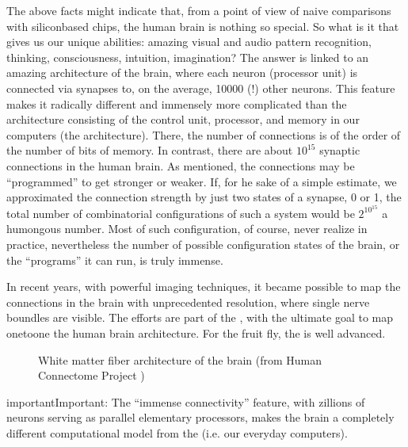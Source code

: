 \documentclass[letterpaper,10pt,english]{jupyterBook}
\let\sphinxpxdimen\pdfpxdimen\else\newdimen\sphinxpxdimen
\begin{document}
\sphinxAtStartPar
The above facts might indicate that, from a point of view of naive comparisons with silicon\sphinxhyphen{}based chips, the human brain is nothing so special. So what is it that gives us our unique abilities: amazing visual and audio pattern recognition, thinking, consciousness, intuition, imagination? The answer is linked to an amazing architecture of the brain, where each neuron (processor unit) is connected via synapses to, on the average, 10000 (!) other neurons. This feature makes it radically different and immensely more complicated than the architecture consisting of the control unit, processor, and memory in our computers (the  architecture). There, the number of connections is of the order of the number of bits of memory. In contrast, there are about \(10^{15}\) synaptic connections in the human brain. As mentioned, the connections may be “programmed” to get stronger or weaker. If, for he sake of a simple estimate, we approximated the connection strength by just two states of a synapse, 0 or 1, the total number of combinatorial configurations of such a system would be \(2^{10^{15}}\) \sphinxhyphen{} a humongous number. Most of such configuration, of course, never realize in practice, nevertheless the number of possible configuration states of the brain, or the “programs” it can run, is truly immense.

\sphinxAtStartPar
In recent years, with powerful imaging techniques, it became possible to map the connections in the brain with unprecedented resolution, where single nerve boundles are visible. The efforts are part of the , with the ultimate goal to map one\sphinxhyphen{}to\sphinxhyphen{}one the human brain architecture. For the fruit fly, the  is well advanced.

\begin{figure}[htbp]
\centering
\capstart

\noindent\sphinxincludegraphics[width=280\sphinxpxdimen]{{brain}.jpg}
\caption{White matter fiber architecture of the brain (from Human Connectome Project )}\label{\detokenize{docs/intro:connectome-fig}}\end{figure}

\begin{sphinxadmonition}{important}{Important:}
\sphinxAtStartPar
The “immense connectivity” feature, with zillions of neurons serving as parallel elementary processors, makes the brain a completely different computational model from the  (i.e. our everyday computers).
\end{sphinxadmonition}
\end{document}

